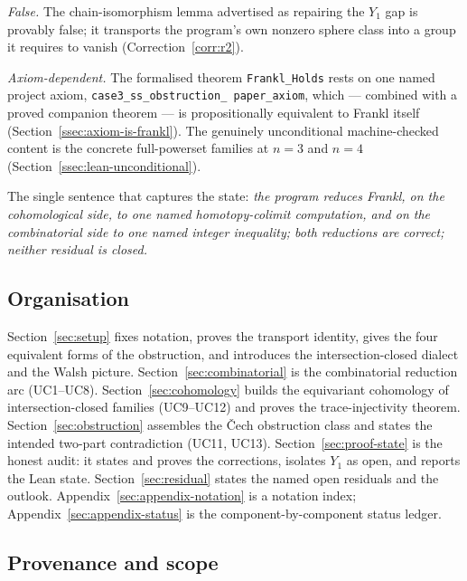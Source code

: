 \begin{description}[leftmargin=1.4em,style=nextline]
\item[UC14 ``$R2$''. ]
\emph{False.} The chain-isomorphism lemma advertised as repairing the
$Y_1$ gap is provably false; it transports the program's own nonzero
sphere class into a group it requires to vanish
(Correction~\ref{corr:r2}).

\item[The Lean headline, Section~\ref{ssec:lean-state}.]
\emph{Axiom-dependent.} The formalised theorem \texttt{Frankl\_Holds}
rests on one named project axiom, \texttt{case3\_ss\_obstruction\_%
paper\_axiom}, which --- combined with a proved companion theorem ---
is propositionally equivalent to Frankl itself
(Section~\ref{ssec:axiom-is-frankl}). The genuinely unconditional
machine-checked content is the concrete full-powerset families at
$n=3$ and $n=4$ (Section~\ref{ssec:lean-unconditional}).

\end{description}

\noindent The single sentence that captures the state: \emph{the
program reduces Frankl, on the cohomological side, to one named
homotopy-colimit computation, and on the combinatorial side to one
named integer inequality; both reductions are correct; neither
residual is closed.}

\subsection{Organisation}
\label{ssec:organisation}

Section~\ref{sec:setup} fixes notation, proves the transport identity,
gives the four equivalent forms of the obstruction, and introduces the
intersection-closed dialect and the Walsh picture.
Section~\ref{sec:combinatorial} is the combinatorial reduction arc
(UC1--UC8). Section~\ref{sec:cohomology} builds the equivariant
cohomology of intersection-closed families (UC9--UC12) and proves the
trace-injectivity theorem. Section~\ref{sec:obstruction} assembles the
\v{C}ech obstruction class and states the intended two-part
contradiction (UC11, UC13). Section~\ref{sec:proof-state} is the honest
audit: it states and proves the corrections, isolates $Y_1$ as open,
and reports the Lean state. Section~\ref{sec:residual} states the named
open residuals and the outlook. Appendix~\ref{sec:appendix-notation}
is a notation index; Appendix~\ref{sec:appendix-status} is the
component-by-component status ledger.

\subsection{Provenance and scope}
\label{ssec:provenance}

